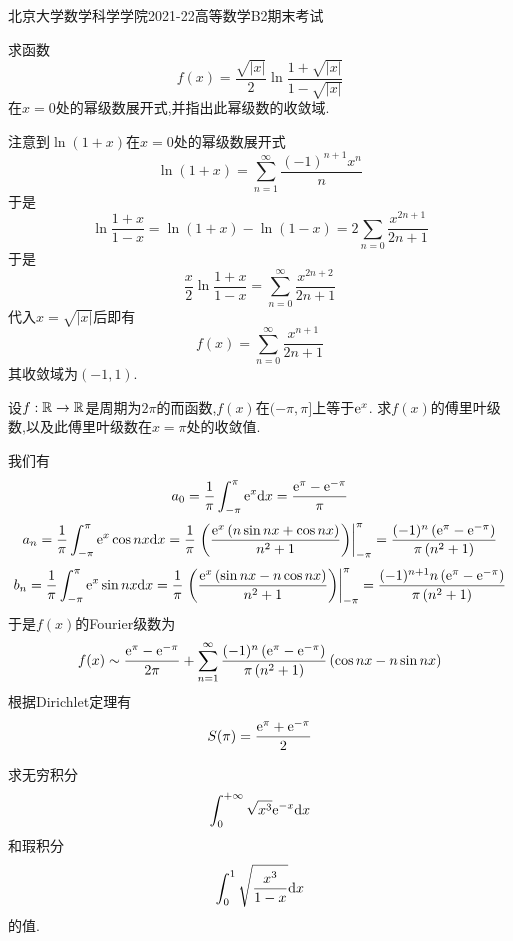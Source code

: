 \documentclass{ctexart}
\begin{document}
\pagestyle{empty}
\begin{center}\Large
    北京大学数学科学学院2021-22高等数学B2期末考试
\end{center}
\begin{problem}[1.(10\songti{分})]
    求函数
    \[f(x)=\dfrac{\sqrt{|x|}}{2}\ln\dfrac{1+\sqrt{|x|}}{1-\sqrt{|x|}}\]
    在$x=0$处的幂级数展开式,并指出此幂级数的收敛域.

\end{problem}
\begin{solution}
    注意到$\ln(1+x)$在$x=0$处的幂级数展开式
    \[\ln(1+x)=\sum_{n=1}^{\infty}\dfrac{(-1)^{n+1}x^n}{n}\]
    于是
    \[\ln\dfrac{1+x}{1-x}=\ln(1+x)-\ln(1-x)=2\sum_{n=0}\dfrac{x^{2n+1}}{2n+1}\]
    于是
    \[\dfrac{x}{2}\ln\dfrac{1+x}{1-x}=\sum_{n=0}^{\infty}\dfrac{x^{2n+2}}{2n+1}\]
    代入$x=\sqrt{|x|}$后即有
    \[f(x)=\sum_{n=0}^{\infty}\dfrac{x^{n+1}}{2n+1}\]
    其收敛域为$(-1,1)$.
\end{solution}
\begin{problem}[2.(15\songti{分})]
    设$f:\mathbb{R}\to\mathbb{R}$是周期为$2\pi$的而函数,$f(x)$在$(-\pi,\pi]$上等于$\mathrm{e}^x$.%
    求$f(x)$的傅里叶级数,以及此傅里叶级数在$x=\pi$处的收敛值.

\end{problem}
\begin{solution}
    我们有
    \[a_0=\dfrac{1}{\pi}\int_{-\pi}^{\pi}\mathrm{e}^{x}\mathrm{d} x=\dfrac{\mathrm{e}^{\pi}-\mathrm{e}^{-\pi}}{\pi}\]
    \[a_n=\dfrac{1}{\pi}\int_{-\pi}^{\pi}\mathrm{e}^{x}\cos nx\mathrm{d} x 
    =\dfrac{1}{\pi}\left.\left(\dfrac{\mathrm{e}^x\left(n\sin nx+\cos nx\right)}{n^2+1}\right)\right|_{-\pi}^{\pi} 
    =\dfrac{(-1)^n\left(\mathrm{e}^{\pi}-\mathrm{e}^{-\pi}\right)}{\pi\left(n^2+1\right)}\]
    \[b_n=\dfrac{1}{\pi}\int_{-\pi}^{\pi}\mathrm{e}^{x}\sin nx\mathrm{d} x 
    =\dfrac{1}{\pi}\left.\left(\dfrac{\mathrm{e}^x\left(\sin nx-n\cos nx\right)}{n^2+1}\right)\right|_{-\pi}^{\pi} 
    =\dfrac{(-1)^{n+1}n\left(\mathrm{e}^{\pi}-\mathrm{e}^{-\pi}\right)}{\pi\left(n^2+1\right)}\]
    于是$f(x)$的Fourier级数为
    \[f(x)\sim\dfrac{\mathrm{e}^{\pi}-\mathrm{e}^{-\pi}}{2\pi}+\sum_{n=1}^{\infty}\dfrac{(-1)^n\left(\mathrm{e}^{\pi}-\mathrm{e}^{-\pi}\right)}{\pi\left(n^2+1\right)}\left(\cos nx-n\sin nx\right)\]
    根据Dirichlet定理有
    \[S(\pi)=\dfrac{\mathrm{e}^\pi+\mathrm{e}^{-\pi}}{2}\]

\end{solution}
\begin{problem}[3.(10\songti{分})]
    求无穷积分
    \[\int_0^{+\infty}\sqrt{x^3}\mathrm{e}^{-x}\mathrm{d} x\]
    和瑕积分
    \[\int_0^1\sqrt{\dfrac{x^3}{1-x}}\mathrm{d} x\]
    的值.

\end{problem}
\end{document}
